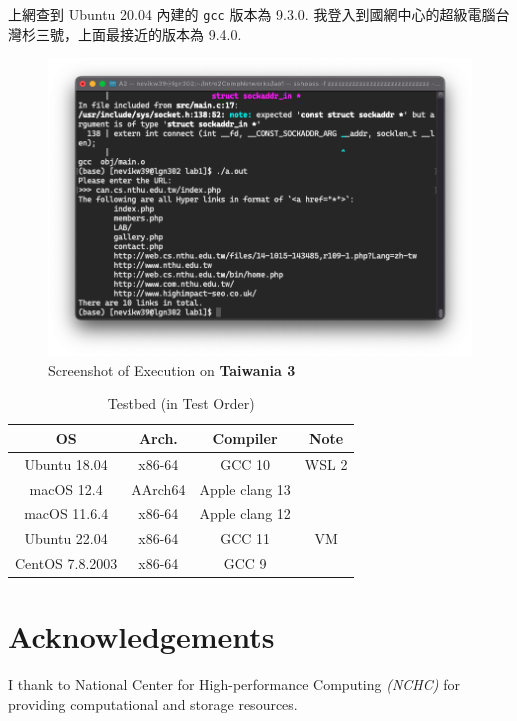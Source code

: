 \documentclass[12pt, a4paper]{article}
\begin{document}
上網查到 \textsf{Ubuntu} 20.04 內建的 \texttt{gcc} 版本為 9.3.0. 我登入到國網中心的超級電腦台灣杉三號，上面最接近的版本為 9.4.0.

\begin{figure}[htbp]
\centering
\includegraphics[width=\linewidth]{screenshot_twnia3}
\caption{Screenshot of Execution on \textbf{Taiwania 3}}
\label{fig:screenshot_twnia3}
\end{figure}

\begin{table}[htp]
\caption{Testbed (in Test Order)}
\centering
\begin{tabular}{c|c|c|c}
OS & Arch. & Compiler & Note \\\hline
Ubuntu 18.04 & x86-64 & GCC 10 & WSL 2 \\
macOS 12.4 & AArch64 & Apple clang 13 \\
macOS 11.6.4 & x86-64 & Apple clang 12 \\
Ubuntu 22.04 & x86-64 & GCC 11 & VM \\
CentOS 7.8.2003 & x86-64 & GCC 9 \\
\end{tabular}
\label{tab:testbed}
\end{table}

\section*{Acknowledgements}

I thank to \textsf{National Center for High-performance Computing} \textit{(NCHC)} for providing computational and storage resources.
\end{document}
